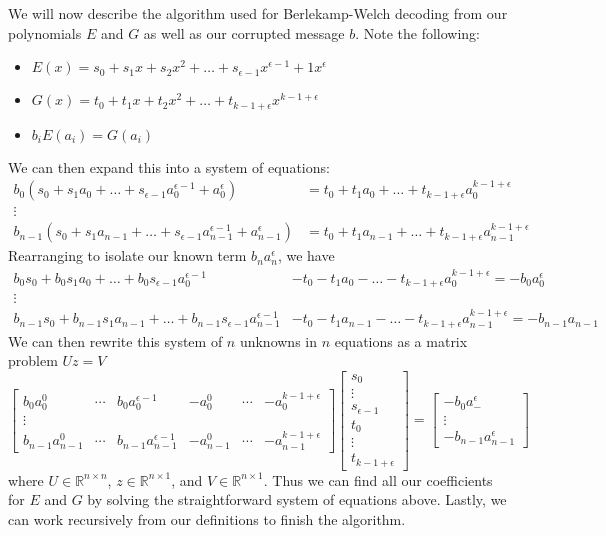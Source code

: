 \documentclass{article}
\begin{document}
We will now describe the algorithm used for Berlekamp-Welch decoding from our polynomials $E$ and $G$ as well as our corrupted message $b$. Note the following:
\begin{itemize}
    \item $E(x)=s_0+s_1x+s_2x^2+\dots+s_{\epsilon-1}x^{\epsilon-1}+1x^\epsilon$
    \item $G(x)=t_0+t_1x+t_2x^2+\dots+t_{k-1+\epsilon}x^{k-1+\epsilon}$
    \item $b_iE(a_i)=G(a_i)$
\end{itemize}
We can then expand this into a system of equations:
\begin{align*}
    b_0(s_0+s_1a_0+\dots+s_{\epsilon-1}a_0^{\epsilon-1}+a_0^\epsilon) &= t_0+t_1a_0+\dots+t_{k-1+\epsilon}a_0^{k-1+\epsilon}\\ \vdots \\
    b_{n-1}(s_0+s_1a_{n-1}+\dots+s_{\epsilon-1}a_{n-1}^{\epsilon-1}+a_{n-1}^\epsilon) &= t_0+t_1a_{n-1}+\dots+t_{k-1+\epsilon}a_{n-1}^{k-1+\epsilon}
\end{align*}
Rearranging to isolate our known term $b_na_n^\epsilon$, we have
\begin{align*}
    b_0s_0+b_0s_1a_0+\dots+b_0s_{\epsilon-1}a_0^{\epsilon-1}&-t_0-t_1a_0-\dots-t_{k-1+\epsilon}a_0^{k-1+\epsilon}=-b_0a_0^\epsilon\\
    \vdots \\
    b_{n-1}s_0+b_{n-1}s_1a_{n-1}+\dots+b_{n-1}s_{\epsilon-1}a_{n-1}^{\epsilon-1}&-t_0-t_1a_{n-1}-\dots-t_{k-1+\epsilon}a_{n-1}^{k-1+\epsilon} = -b_{n-1}a_{n-1}
\end{align*}
We can then rewrite this system of $n$ unknowns in $n$ equations as a matrix problem $Uz=V$
\[
\left[\begin{array}{cccccc}
    b_0a_0^0 & \cdots & b_0a_0^{\epsilon-1} &  -a_0^0 & \cdots & -a_0^{k-1+\epsilon}\\ \vdots \\
    b_{n-1}a_{n-1}^0 & \cdots & b_{n-1}a_{n-1}^{\epsilon-1} &  -a_{n-1}^0 & \cdots & -a_{n-1}^{k-1+\epsilon}
\end{array}
\right] \left[\begin{array}{c}
    s_0 \\ \vdots \\ s_{\epsilon-1}\\t_0 \\ \vdots \\ t_{k-1+\epsilon}
\end{array}
\right]=\left[\begin{array}{c}
    -b_0a_-^\epsilon \\ \vdots \\ -b_{n-1}a_{n-1}^\epsilon
\end{array}\right]
\]
where $U\in \mathbb{R}^{n\times n}$, $z\in \mathbb{R}^{n\times 1}$, and $V\in\mathbb{R}^{n\times1}$. Thus we can find all our coefficients for $E$ and $G$ by solving the straightforward system of equations above. Lastly, we can work recursively from our definitions to finish the algorithm.
\end{document}
